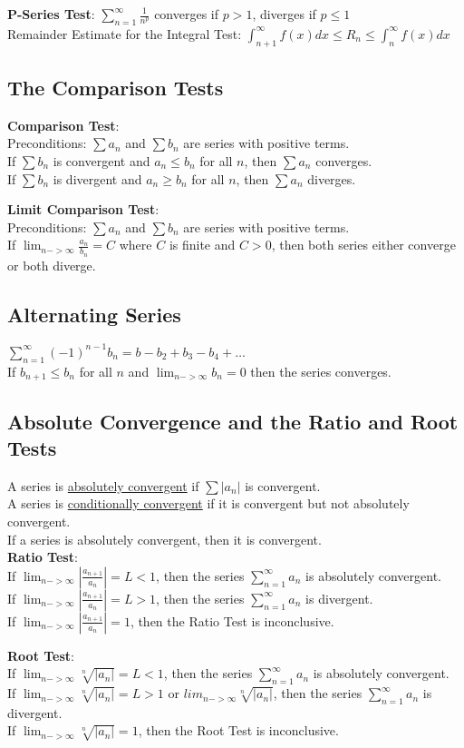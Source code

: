 \documentclass{article}
\begin{document}
\textbf{P-Series Test}: $\sum_{n=1}^{\infty} \frac{1}{n^p}$ converges if $p>1$, diverges if $p \leq 1$ \\
Remainder Estimate for the Integral Test: $\int^{\infty}_{n+1} f(x) dx \leq R_n \leq \int^{\infty}_{n} f(x) dx$

\subsection{The Comparison Tests}
\textbf{Comparison Test}:\\
Preconditions: $ \sum a_n$ and $\sum b_n$ are series with positive terms. \\
If $\sum b_n$ is convergent and $a_n \leq b_n$ for all $n$, then $\sum a_n$ converges.\\
If $\sum b_n$ is divergent and $a_n \geq b_n$ for all $n$, then $\sum a_n$ diverges.

\textbf{Limit Comparison Test}:\\
Preconditions: $ \sum a_n$ and $\sum b_n$ are series with positive terms. \\
If $\lim_{n-> \infty} \frac{a_n}{b_n} = C$ where $C$ is finite and $C > 0$, then both series either converge or both diverge.

\subsection{Alternating Series}
$\sum_{n=1}^{\infty} (-1)^{n-1} b_n = b - b_2 + b_3 - b_4 + \ldots$ \\
If $b_{n+1} \leq b_n$ for all $n$ and $\lim_{n -> \infty} b_n = 0$ then the series converges.

\subsection{Absolute Convergence and the Ratio and Root Tests}
A series is \underline{absolutely convergent} if $\sum |a_n|$ is convergent. \\
A series is \underline{conditionally convergent} if it is convergent but not absolutely convergent. \\
If a series is absolutely convergent, then it is convergent. \\

\textbf{Ratio Test}:\\
If $\lim_{n -> \infty} |\frac{a_{n+1}}{a_n}| = L < 1$, then the series $\sum^{\infty}_{n=1} a_n$ is absolutely convergent.\\
If $\lim_{n -> \infty} |\frac{a_{n+1}}{a_n}| = L > 1$, then the series $\sum^{\infty}_{n=1} a_n$ is divergent.\\
If $\lim_{n -> \infty} |\frac{a_{n+1}}{a_n}| = 1$, then the Ratio Test is inconclusive.

\textbf{Root Test}:\\
If $\lim_{n -> \infty} \sqrt[n]{|a_n|} = L < 1$, then the series $\sum_{n=1}^{\infty} a_n$ is absolutely convergent.\\
If $\lim_{n -> \infty} \sqrt[n]{|a_n|} = L > 1$ or $lim_{n -> \infty} \sqrt[n]{|a_n|}$, then the series $\sum_{n=1}^{\infty} a_n$ is divergent.\\
If $\lim_{n -> \infty} \sqrt[n]{|a_n|} = 1$, then the Root Test is inconclusive.
\end{document}
